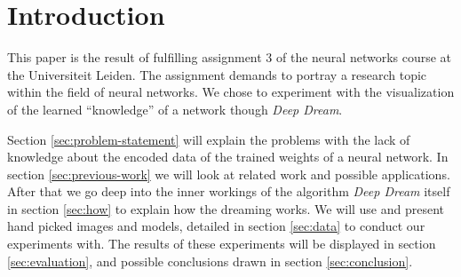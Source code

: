 \section{Introduction}
This paper is the result of fulfilling assignment 3 of the neural networks course at the Universiteit Leiden.
The assignment demands to portray a research topic within the field of neural networks.
We chose to experiment with the visualization of the learned \enquote{knowledge} of a network though \emph{Deep Dream}.

Section \ref{sec:problem-statement} will explain the problems with the lack of knowledge about the encoded data of the trained weights of a neural network.
In section \ref{sec:previous-work} we will look at related work and possible applications.
After that we go deep into the inner workings of the algorithm \textit{Deep Dream} itself in section \ref{sec:how} to explain how the dreaming works.
We will use and present hand picked images and models, detailed in section \ref{sec:data} to conduct our experiments with. 
The results of these experiments will be displayed in section \ref{sec:evaluation}, and possible conclusions drawn in section \ref{sec:conclusion}.





